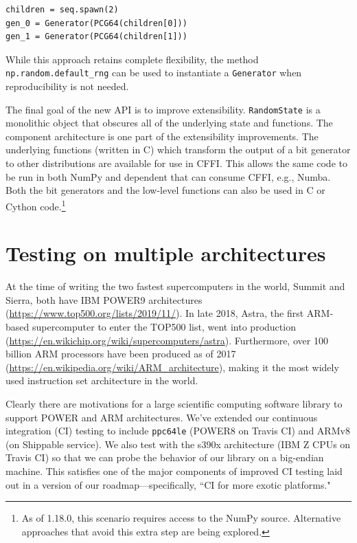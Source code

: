 \begin{lstlisting}
children = seq.spawn(2)
gen_0 = Generator(PCG64(children[0]))
gen_1 = Generator(PCG64(children[1]))
\end{lstlisting}

While this approach retains complete flexibility, the method
\texttt{np.random.default\_rng} can be used to instantiate a \texttt{Generator} when
reproducibility is not needed.

The final goal of the new API is to improve extensibility. \texttt{RandomState} is
a monolithic object that obscures all of the underlying state and functions. The
component architecture is one part of the extensibility improvements. The
underlying functions (written in C) which transform the output of a bit
generator to other distributions are available for use in CFFI. This allows the
same code to be run in both NumPy and dependent that can consume CFFI, e.g.,
Numba. Both the bit generators and the low-level functions can also be used in C
or Cython code.\footnote{As of 1.18.0, this scenario requires access to the
NumPy source. Alternative approaches that avoid this extra step are being
explored.}

\section*{Testing on multiple architectures}

At the time of writing the two fastest supercomputers in the
world, Summit and Sierra, both have IBM POWER9 architectures
(\url{https://www.top500.org/lists/2019/11/}).
In late 2018, Astra, the first ARM-based supercomputer
to enter the TOP500 list, went into production
(\url{https://en.wikichip.org/wiki/supercomputers/astra}).
Furthermore, over 100 billion ARM processors have been produced as
of 2017 (\url{https://en.wikipedia.org/wiki/ARM_architecture}),
making it the most widely used instruction set architecture
in the world.

Clearly there are motivations for a large scientific computing
software library to support POWER and ARM architectures. We've extended
our continuous integration (CI) testing to include \texttt{ppc64le}
(POWER8 on Travis CI) and ARMv8 (on Shippable service). We also test
with the s390x architecture (IBM Z CPUs on Travis CI) so that we
can probe the behavior of our library on a big-endian machine.
This satisfies one of the major components of
improved CI testing laid out in a version of our
roadmap---specifically, ``CI for more exotic
platforms."

